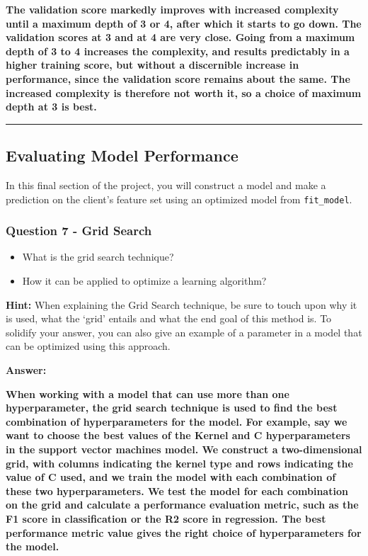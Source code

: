 \documentclass[11pt]{article}
\providecommand{\tightlist}{%
      \setlength{\itemsep}{0pt}\setlength{\parskip}{0pt}}
\begin{document}
\textbf{The validation score markedly improves with increased complexity
until a maximum depth of 3 or 4, after which it starts to go down. The
validation scores at 3 and at 4 are very close. Going from a maximum
depth of 3 to 4 increases the complexity, and results predictably in a
higher training score, but without a discernible increase in
performance, since the validation score remains about the same. The
increased complexity is therefore not worth it, so a choice of maximum
depth at 3 is best.}

    \begin{center}\rule{0.5\linewidth}{\linethickness}\end{center}

\hypertarget{evaluating-model-performance}{%
\subsection{Evaluating Model
Performance}\label{evaluating-model-performance}}

In this final section of the project, you will construct a model and
make a prediction on the client's feature set using an optimized model
from \texttt{fit\_model}.

    \hypertarget{question-7---grid-search}{%
\subsubsection{Question 7 - Grid
Search}\label{question-7---grid-search}}

\begin{itemize}
\tightlist
\item
  What is the grid search technique?
\item
  How it can be applied to optimize a learning algorithm?
\end{itemize}

\textbf{Hint:} When explaining the Grid Search technique, be sure to
touch upon why it is used, what the `grid' entails and what the end goal
of this method is. To solidify your answer, you can also give an example
of a parameter in a model that can be optimized using this approach.

    \textbf{Answer:}

\textbf{When working with a model that can use more than one
hyperparameter, the grid search technique is used to find the best
combination of hyperparameters for the model. For example, say we want
to choose the best values of the Kernel and C hyperparameters in the
support vector machines model. We construct a two-dimensional grid, with
columns indicating the kernel type and rows indicating the value of C
used, and we train the model with each combination of these two
hyperparameters. We test the model for each combination on the grid and
calculate a performance evaluation metric, such as the F1 score in
classification or the R2 score in regression. The best performance
metric value gives the right choice of hyperparameters for the model.}
\end{document}
